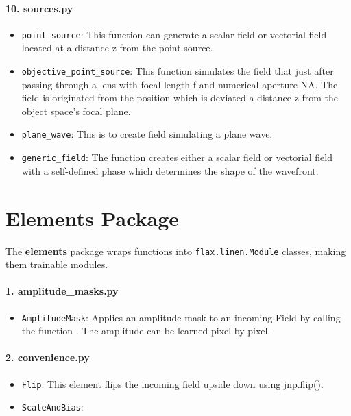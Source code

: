 \documentclass[a4paper,12pt]{report}
\begin{document}
\paragraph*{10. \textbf{sources.py}}
\begin{itemize}
  \item \texttt{point\_source}: This function can generate a scalar field or vectorial field located at a distance z from the point source.
  \item \texttt{objective\_point\_source}: This function simulates the field that just after passing through a lens with focal length f and numerical aperture NA. The field is originated from the position which is deviated a distance z from the object space's focal plane.
  \item \texttt{plane\_wave}: This is to create field simulating a plane wave.
  \item \texttt{generic\_field}: The function creates either a scalar field or vectorial field with a self-defined phase which determines the shape of the wavefront.
\end{itemize}

\section{Elements Package}
The \textbf{elements} package wraps functions into \texttt{flax.linen.Module} classes, making them trainable modules.
\paragraph*{1. \textbf{amplitude\_masks.py}}
\begin{itemize}
  \item \texttt{AmplitudeMask}: Applies an amplitude mask to an incoming Field by calling the function . The amplitude can be learned pixel by pixel.
\end{itemize}

\paragraph*{2. \textbf{convenience.py}}
\begin{itemize}
  \item \texttt{Flip}: This element flips the incoming field upside down using jnp.flip().
  \item \texttt{ScaleAndBias}: 
\end{itemize}
\end{document}
